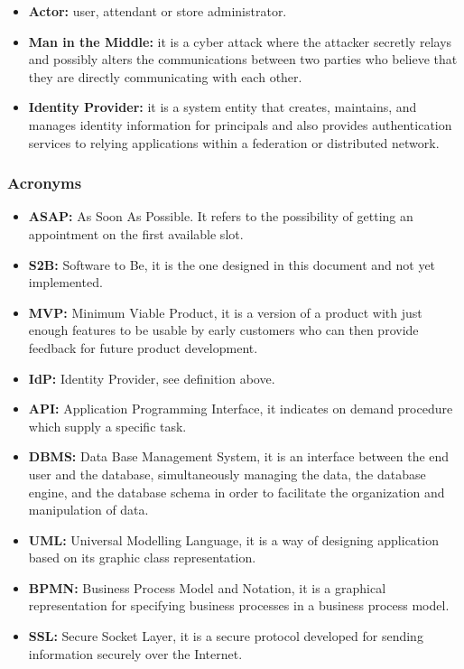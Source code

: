 \documentclass[table, 12pt]{article}
\begin{document}
\begin{itemize}
    \item \textbf{Actor:} user, attendant or store administrator.
    \item \textbf{Man in the Middle:} it is a cyber attack where the attacker secretly relays and possibly alters the communications between two parties who believe that they are directly communicating with each other.
    \item \textbf{Identity Provider:} it is a system entity that creates, maintains, and manages identity information for principals and also provides authentication services to relying applications within a federation or distributed network.
\end{itemize}
\subsubsection{Acronyms}
\begin{itemize}
    \item {\textbf{ASAP:} As Soon As Possible. It refers to the possibility of getting an appointment on the first available slot.}
    \item {\textbf{S2B:} Software to Be, it is the one designed in this document and not yet implemented.}
    \item \textbf{MVP:} Minimum Viable Product, it is a version of a product with just enough features to be usable by early customers who can then provide feedback for future product development.
    \item \textbf{IdP:} Identity Provider, see definition above.
    \item {\textbf{API:} Application Programming Interface, it indicates on demand procedure which supply a specific task.}
    \item \textbf{DBMS:} Data Base Management System, it is an interface between the end user and the database, simultaneously managing the data, the database engine, and the database schema in order to facilitate the organization and manipulation of data.
    \item {\textbf{UML:} Universal Modelling Language, it is a way of designing application based on its graphic class representation.}
    \item \textbf{BPMN:} Business Process Model and Notation, it is a graphical representation for specifying business processes in a business process model.
    \item \textbf{SSL:} Secure Socket Layer, it is a secure protocol developed for sending information securely over the Internet.
\end{itemize}
\end{document}
